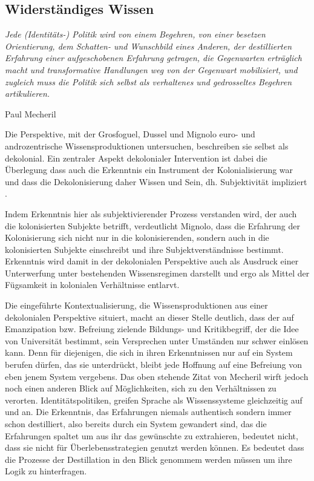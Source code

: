 \subsection{Widerständiges Wissen}
\epigraph{\textit{ 
Jede (Identitäts-) Politik wird von einem Begehren, von einer besetzen
Orientierung, dem Schatten- und Wunschbild eines Anderen, der destillierten
Erfahrung einer aufgeschobenen Erfahrung getragen, die Gegenwarten erträglich
macht und transformative Handlungen weg von der Gegenwart mobilisiert, und
zugleich muss die Politik sich selbst als verhaltenes und gedrosseltes Begehren
artikulieren.
    }}{Paul Mecheril \footnotemark}   

Die Perspektive, mit der Grosfoguel, Dussel und Mignolo euro- und
androzentrische Wissensproduktionen untersuchen, beschreiben sie selbst als
dekolonial. Ein zentraler Aspekt dekolonialer Intervention ist dabei die
Überlegung \glqq dass auch die Erkenntnis ein Instrument der Kolonialisierung war
und dass die Dekolonisierung daher Wissen und Sein, dh. Subjektivität
impliziert \grqq. \footnotemark {}

Indem Erkenntnis hier als subjektivierender Prozess verstanden wird, der auch
die kolonisierten Subjekte betrifft, verdeutlicht Mignolo, dass die Erfahrung
der Kolonisierung sich nicht nur in die kolonisierenden, sondern auch in die
kolonisierten Subjekte einschreibt und ihre Subjektverständnisse bestimmt.
Erkenntnis wird damit in der dekolonialen Perspektive auch als Ausdruck einer
Unterwerfung unter bestehenden Wissensregimen darstellt und ergo als Mittel
der Fügsamkeit in kolonialen Verhältnisse entlarvt.  

Die eingeführte Kontextualisierung, die Wissensproduktionen aus einer
dekolonialen Perspektive situiert, macht an dieser Stelle deutlich, dass der
auf Emanzipation bzw. Befreiung zielende Bildungs- und Kritikbegriff, der die
Idee von Universität bestimmt, sein Versprechen unter Umständen nur schwer
einlösen kann. Denn für diejenigen,  die sich in ihren Erkenntnissen nur auf
ein System berufen dürfen, das sie unterdrückt,  bleibt jede Hoffnung auf eine
Befreiung von eben jenem System vergebens. Das oben stehende Zitat von Mecheril
wirft jedoch noch einen anderen Blick auf Möglichkeiten, sich zu den
Verhältnissen zu verorten. Identitätspolitiken, greifen Sprache als
Wissenssysteme gleichzeitig auf und an. Die Erkenntnis, das Erfahrungen niemals
authentisch sondern immer schon destilliert, also bereits durch ein System
gewandert sind, das die  Erfahrungen spaltet um aus ihr das gewünschte zu
extrahieren, bedeutet nicht, dass sie nicht für Überlebensstrategien genutzt
werden können. Es bedeutet dass die Prozesse der Destillation in den Blick
genommem werden müssen um ihre Logik zu hinterfragen.

